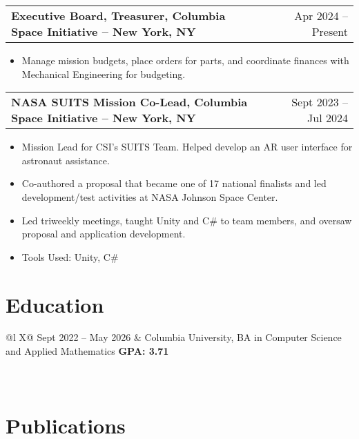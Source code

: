 \documentclass[a4paper,12pt]{article}
\makeatletter
\newenvironment{joblong}[2]
    {
    \begin{tabularx}{\linewidth}{@{}l X r@{}}
    \textbf{#1} & \hfill &  #2 \\[3.75pt]
    \end{tabularx}
    \begin{minipage}[t]{\linewidth}
    \begin{itemize}[nosep,after=\strut, leftmargin=1em, itemsep=3pt,label=--]
    }
    {
    \end{itemize}
    \end{minipage}    
    }
\makeatother
\begin{document}
\begin{joblong}{Executive Board, Treasurer, Columbia Space Initiative -- New York, NY}{Apr 2024 -- Present}
\item Manage mission budgets, place orders for parts, and coordinate finances with Mechanical Engineering for budgeting.
\end{joblong}

\begin{joblong}{NASA SUITS Mission Co-Lead, Columbia Space Initiative -- New York, NY}{Sept 2023 -- Jul 2024}
\item Mission Lead for CSI's SUITS Team. Helped develop an AR user interface for astronaut assistance.
\item Co-authored a proposal that became one of 17 national finalists and led development/test activities at NASA Johnson Space Center.
\item Led triweekly meetings, taught Unity and C# to team members, and oversaw proposal and application development.
\item Tools Used: Unity, C#
\end{joblong}

\section{Education}
\begin{tabularx}{\linewidth}{@{}l X@{}}
Sept 2022 -- May 2026 & Columbia University, BA in Computer Science and Applied Mathematics \hfill \textbf{GPA: 3.71} \\
 \\
 \\
\end{tabularx}

\section{Publications}
\begin{refsection}
\nocite{*}
\printbibliography[heading=none]
\end{refsection}
\end{document}
